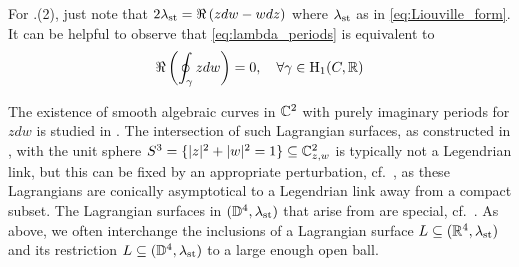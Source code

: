 \noindent For .(2), just note that $2\lambda_{\text{st}}=\Re\left(zdw-wdz\right)$ where $\lambda_{\text{st}}$ as in \eqref{eq:Liouville_form}. It can be helpful to observe that \eqref{eq:lambda_periods} is equivalent to
\begin{equation}\label{eq:lambda_periods2}
   \Re\left(\oint_\gamma zdw\right)=0,\quad \forall\gamma\in \operatorname{H}_1(C,\mathbb{R})
   \end{equation}

The existence of smooth algebraic curves in $\mathbb{C}^2$ with purely imaginary periods for $zdw$ is studied in \cite{eynard2024existenceboutrouxcurvesgfunctions}. The intersection of such Lagrangian surfaces, as constructed in , with the unit sphere $S^3=\{|z|^2+|w|^2=1\}\subseteq\mathbb{C}^2_{z,w}$ is typically not a Legendrian link, but this can be fixed by an appropriate perturbation, cf.~\cite[Section 5.1]{Chantraine10}, as these Lagrangians are conically asymptotical to a Legendrian link away from a compact subset. The Lagrangian surfaces in $(\mathbb{D}^4,\lambda_{\text{st}})$ that arise from  are special, cf.~\cite[Section 2.1]{Joyce_LecturesSLags}. As above, we often interchange the inclusions of a Lagrangian surface $L\subseteq(\mathbb{R}^4,\lambda_{\text{st}})$ and its restriction $L\subseteq(\mathbb{D}^4,\lambda_{\text{st}})$ to a large enough open ball.\\

